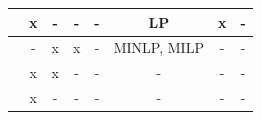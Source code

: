 \documentclass[preprint,12pt]{elsarticle}
\begin{document}
\begin{table}[htbp]
{\begin{tabular}{cccccccc}
\cite{b20}                                         & x                                                                                               & -                                                                         & -                                                                                               & -                                                                                                 & LP                                                                   & x                                                                              & -                                                                  \\ \hline
\cite{b21,b22,b23,b24}                                             & -                                                                                               & x                                                                         & x                                                                                               & -                                                                                                 & MINLP, MILP                                                          & -                                                                              & -                                                                  \\ \hline
\cite{b25}                                     & x                                                                                               & x                                                                         & -                                                                                               & -                                                                                                 & -                                                                    & -                                                                              & -                                                                  \\ \hline
\cite{b26,b27,b28}                                                     & x                                                                                               & -                                                                         & -                                                                                               & -                                                                                                 & -                                                                    & -                                                                              & -                                                                  \\ \hline

\end{tabular}}
\end{table}
\end{document}
